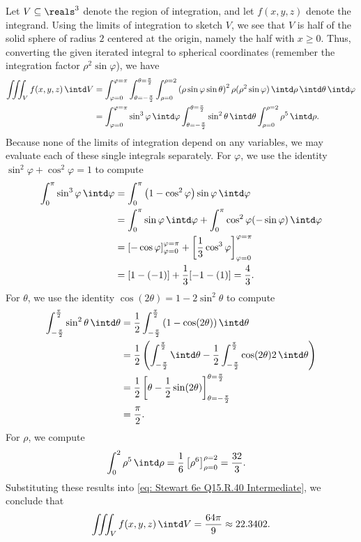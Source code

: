 {Let $V \subseteq \reals^{3}$ denote the region of integration, and let $f(x,y,z)$ denote the integrand. Using the limits of integration to sketch $V$, we see that $V$ is half of the solid sphere of radius $2$ centered at the origin, namely the half with $x \geq 0$. Thus, converting the given iterated integral to spherical coordinates (remember the integration factor $\rho^{2} \sin \varphi$), we have
\begin{align}
\iiint_{V} f(x,y,z) \, \intd V
&=
\int_{\varphi = 0}^{\varphi = \pi} \int_{\theta = -\frac{\pi}{2}}^{\theta = \frac{\pi}{2}} \int_{\rho = 0}^{\rho = 2} \left(\rho \sin \varphi \sin \theta\right)^{2} \rho (\rho^{2} \sin \varphi) \, \intd \rho \, \intd \theta \, \intd \varphi%
\nonumber
\\
&=
\int_{\varphi = 0}^{\varphi = \pi} \sin^{3} \varphi \, \intd \varphi \int_{\theta = -\frac{\pi}{2}}^{\theta = \frac{\pi}{2}} \sin^{2} \theta \, \intd \theta \int_{\rho = 0}^{\rho = 2} \rho^{5} \, \intd \rho.%
\label{eq: Stewart 6e Q15.R.40 Intermediate}
\end{align}
Because none of the limits of integration depend on any variables, we may evaluate each of these single integrals separately. For $\varphi$, we use the identity $\sin^{2} \varphi + \cos^{2} \varphi = 1$ to compute
\begin{align*}
\int_{0}^{\pi} \sin^{3} \varphi \, \intd \varphi
&=
\int_{0}^{\pi} \left(1 - \cos^{2} \varphi\right) \sin \varphi \, \intd \varphi
\\
&=
\int_{0}^{\pi} \sin \varphi \, \intd \varphi + \int_{0}^{\pi} \cos^{2} \varphi (-\sin \varphi) \, \intd \varphi
\\
&=
\left[-\cos \varphi\right]_{\varphi = 0}^{\varphi = \pi} + \left[\frac{1}{3} \cos^{3} \varphi\right]_{\varphi = 0}^{\varphi = \pi}
\\
&=
[1 - (-1)] + \frac{1}{3} [-1 - (1)]
=
\frac{4}{3}.
\end{align*}
For $\theta$, we use the identity $\cos(2 \theta) = 1 - 2 \sin^{2} \theta$ to compute
\begin{align*}
\int_{-\frac{\pi}{2}}^{\frac{\pi}{2}} \sin^{2} \theta \, \intd \theta
&=
\frac{1}{2} \int_{-\frac{\pi}{2}}^{\frac{\pi}{2}} \left(1 - \cos(2 \theta)\right) \intd \theta
\\
&=
\frac{1}{2} \left(\int_{-\frac{\pi}{2}}^{\frac{\pi}{2}} \intd \theta - \frac{1}{2} \int_{-\frac{\pi}{2}}^{\frac{\pi}{2}} \cos(2 \theta) 2 \, \intd \theta\right)
\\
&=
\frac{1}{2} \left[\theta - \frac{1}{2} \sin(2 \theta)\right]_{\theta = -\frac{\pi}{2}}^{\theta = \frac{\pi}{2}}
\\
&=
\frac{\pi}{2}.
\end{align*}
For $\rho$, we compute
\begin{align*}
\int_{0}^{2} \rho^{5} \, \intd \rho
&=
\frac{1}{6} \left[\rho^{6}\right]_{\rho = 0}^{\rho = 2}
=
\frac{32}{3}.
\end{align*}
Substituting these results into \eqref{eq: Stewart 6e Q15.R.40 Intermediate}, we conclude that
\begin{align*}
\iiint_{V} f(x,y,z) \, \intd V
=
\frac{64 \pi}{9}
\approx
22.3402.
\end{align*}
}%
